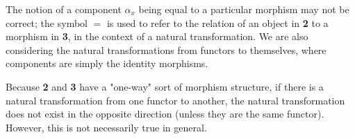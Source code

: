 \documentclass[12pt]{article}
\begin{document}
The notion of a component $\alpha_x$ being equal to a particular morphism may not be correct; the symbol $=$ is used to refer to the relation of an object in \textbf{2} to a morphism in \textbf{3}, in the context of a natural transformation. We are also considering the natural transformations from functors to themselves, where components are simply the identity morphisms.

Because \textbf{2} and \textbf{3} have a "one-way" sort of morphism structure, if there is a natural transformation from one functor to another, the natural transformation does not exist in the opposite direction (unless they are the same functor). However, this is not necessarily true in general.
\end{document}
